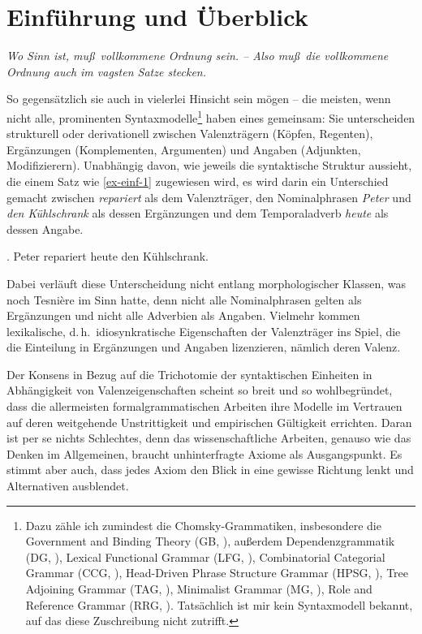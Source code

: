 \chapter{Einführung und Überblick} \label{sec-einfuehrung}


\epigraph{\em Wo Sinn ist, mu\ss \ vollkommene Ordnung sein. -- Also mu\ss \ die vollkommene Ordnung auch im vagsten Satze stecken.\\[-5ex]}{\citet[\S 98]{Wittgenstein:84}}

\noindent So gegensätzlich sie auch in vielerlei Hinsicht sein mögen -- die meisten, wenn nicht alle, prominenten Syntaxmodelle\footnote{Dazu zähle ich zumindest die Chomsky-Grammatiken, insbesondere die Government and Binding Theory (GB, \citealt{Chomsky:81}), au\ss erdem Dependenzgrammatik (DG, \citealt{Tesniere:59,Kunze:75,Heringer:96}), Lexical Functional Grammar (LFG, \citealt{Kaplan:Bresnan:82}), Combinatorial Categorial Grammar (CCG, \citealt{Steedman:00}), Head-Driven Phrase Structure Grammar (HPSG, \citealt{Pollard:Sag:94}), Tree Adjoining Grammar (TAG, \citealt{Joshi:Schabes:97}), Minimalist Grammar (MG, \citealt{Stabler:97}), Role and Reference Grammar (RRG, \citealt{Valin:05}). Tatsächlich ist mir kein Syntaxmodell bekannt, auf das diese Zuschreibung nicht zutrifft.} haben eines gemeinsam: Sie unterscheiden strukturell oder derivationell zwischen Valenzträgern (Köpfen, Regenten), Ergänzungen (Komplementen, Argumenten) und Angaben (Adjunkten, Modifizierern). Unabhängig davon, wie jeweils die syntaktische Struktur aussieht, die einem Satz wie \ref{ex-einf-1} zugewiesen wird, es wird darin ein Unterschied gemacht zwischen {\it repariert} als dem Valenzträger, den Nominalphrasen {\it Peter} und {\it den Kühlschrank} als dessen Ergänzungen und dem Temporaladverb {\it heute} als dessen Angabe.
  
\ex. \label{ex-einf-1} Peter repariert heute den Kühlschrank.

Dabei verläuft diese Unterscheidung nicht entlang morphologischer Klassen, was noch Tesni\`ere im Sinn hatte, denn nicht alle Nominalphrasen gelten als Ergänzungen und nicht alle Adverbien als Angaben. Vielmehr kommen lexikalische, d.\,h.\ idiosynkratische Eigenschaften der Valenzträger ins Spiel, die die Einteilung in Ergänzungen und Angaben lizenzieren, nämlich deren Valenz.   

Der Konsens in Bezug auf die Trichotomie der syntaktischen Einheiten in Abhängigkeit von Valenzeigenschaften scheint so breit und so wohlbegründet, dass die allermeisten formalgrammatischen Arbeiten ihre Modelle im Vertrauen auf deren weitgehende Unstrittigkeit und empirischen Gültigkeit errichten. Daran ist per se nichts Schlechtes, denn das wissenschaftliche Arbeiten, genauso wie das Denken im Allgemeinen, braucht unhinterfragte Axiome als Ausgangspunkt. Es stimmt aber auch, dass jedes Axiom den Blick in eine gewisse Richtung lenkt und Alternativen ausblendet. 

